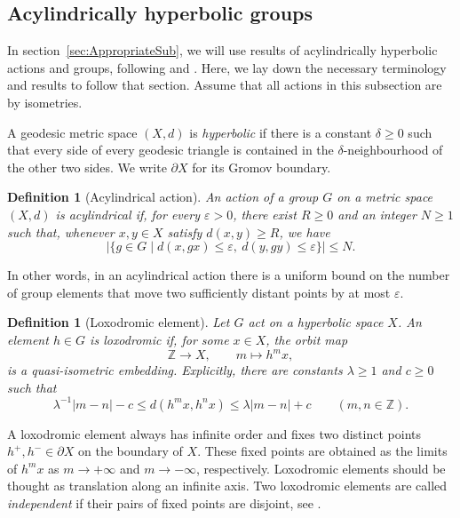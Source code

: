 \documentclass[11pt,letterpaper]{amsart}
\newtheorem{definition}[prop]{Definition}
\newcommand{\ZZ}{\mathbb{Z}}
\begin{document}
\subsection{Acylindrically hyperbolic groups} \label{sec:AcylindricallyHyperbolic}

In section~\ref{sec:AppropriateSub}, we will use results of acylindrically hyperbolic actions and groups, following 
\cite[Sections~1 and~2]{OsinAcylindrical} and
\cite[Section~6.1]{DGO}. Here, we lay down the necessary terminology and results to follow that section. Assume that all actions in this subsection are by isometries.

A geodesic metric space $(X,d)$ is \emph{hyperbolic} if there is a constant
$\delta\geq0$ such that every side of every geodesic triangle is contained
in the $\delta$-neighbourhood of the other two sides.  We write $\partial X$
for its Gromov boundary.

\begin{definition}[Acylindrical action]
\label{def:acylindrical}
An action of a group $G$ on a metric space $(X,d)$ is \emph{acylindrical} if,
for every $\varepsilon>0$, there exist $R\geq0$ and an integer $N\geq1$ such
that, whenever $x,y\in X$ satisfy $d(x,y)\geq R$, we have
\[
    \bigl|\{g\in G\mid d(x,gx)\leq\varepsilon,
                       \ d(y,gy)\leq\varepsilon\}\bigr|\leq N.
\]

\end{definition}
In other words, in an acylindrical action there is a uniform bound on the number of group elements that move
two sufficiently distant points by at most $\varepsilon$.
\begin{definition}[Loxodromic element]
\label{def:loxodromic}
Let $G$ act on a hyperbolic space $X$.  An element $h\in G$ is
\emph{loxodromic} if, for some $x\in X$, the orbit map
\[
    \ZZ\longrightarrow X,\qquad m\longmapsto h^m x,
\]
is a quasi-isometric embedding.  Explicitly, there are constants
$\lambda\geq1$ and $c\geq0$ such that
\[
    \lambda^{-1}|m-n|-c
    \leq d(h^m x,h^n x)
    \leq\lambda|m-n|+c
    \qquad(m,n\in\ZZ).
\]

\end{definition}

A loxodromic element always has infinite order and fixes two distinct points
$h^+,h^-\in\partial X$ on the boundary of $X$. These fixed points are obtained as the limits of $h^m x$ as
$m\to+\infty$ and $m\to-\infty$, respectively. Loxodromic elements should be thought as translation along an infinite axis.  Two loxodromic elements
are called \emph{independent} if their pairs of fixed points are disjoint,
see \cite[Section~1]{OsinAcylindrical}.
\end{document}
